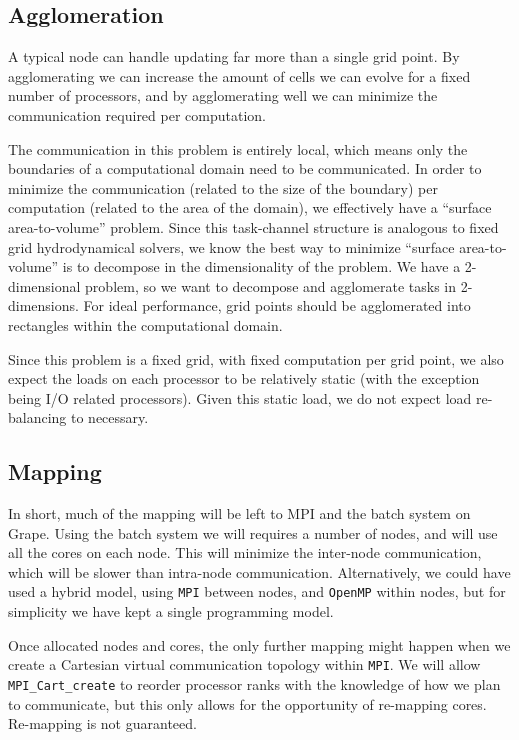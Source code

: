 \documentclass[iop, apj]{emulateapj}
\begin{document}
\subsection{Agglomeration}

A typical node can handle updating far more than a single grid point.  By agglomerating we can increase the amount of cells we can evolve for a fixed number of processors, and by agglomerating well we can minimize the communication required per computation.

The communication in this problem is entirely local, which means only the boundaries of a computational domain need to be communicated.  In order to minimize the communication (related to the size of the boundary) per computation (related to the area of the domain), we effectively have a ``surface area-to-volume'' problem.  Since this task-channel structure is analogous to fixed grid hydrodynamical solvers, we know the best way to minimize ``surface area-to-volume'' is to decompose in the dimensionality of the problem.  We have a 2-dimensional problem, so we want to decompose and agglomerate tasks in 2-dimensions. For ideal performance, grid points should be agglomerated into rectangles within the computational domain.

Since this problem is a fixed grid, with fixed computation per grid point, we also expect the loads on each processor to be relatively static (with the exception being I/O related processors). Given this static load, we do not expect load re-balancing to necessary.

\subsection{Mapping}

In short, much of the mapping will be left to MPI and the batch system on Grape.  Using the batch system we will requires a number of nodes, and will use all the cores on each node. This will minimize the inter-node communication, which will be slower than intra-node communication. Alternatively, we could have used a hybrid model, using \texttt{MPI} between nodes,
and \texttt{OpenMP} within nodes, but for simplicity we have kept a single programming model.

Once allocated nodes and cores, the only further mapping might happen when we create a Cartesian virtual communication topology within \texttt{MPI}.  We will allow \texttt{MPI\_Cart\_create} to reorder processor ranks with the knowledge of how we plan to communicate, but this only allows for the opportunity of re-mapping cores.  Re-mapping is not guaranteed.
\end{document}
